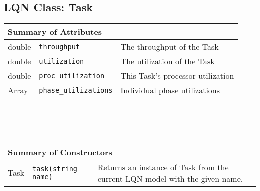 \subsection{LQN Class: Task}
\begin{tabular}{|p{1.0in}|p{2.3in}||p{2.8in}|}
  \hline
  \multicolumn{3}{|l|}{\textbf{Summary of Attributes}}\\
  \hline
  double & {\tt throughput} & The throughput of the Task\\
  double & {\tt utilization} & The utilization of the Task\\
  double & {\tt proc\_utilization} & This Task's processor utilization\\
  Array & {\tt phase\_utilizations} & Individual phase utilizations\\
  \hline
\end{tabular}
\\\\\ \\
\begin{tabular}{|p{1.0in}|p{2.3in}||p{2.8in}|}
  \hline
  \multicolumn{3}{|l|}{\textbf{Summary of Constructors}}\\
  \hline
  Task & {\tt task(string name)} & Returns an instance of Task from the current LQN model with the given name.\\
  \hline
\end{tabular}

